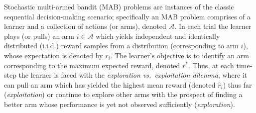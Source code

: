 Stochastic multi-armed bandit (MAB) problems are instances of the classic sequential decision-making scenario; specifically an MAB problem comprises of a learner and a collection of actions (or arms), denoted $\mathcal{A}$. In each trial the learner plays (or pulls) an arm $i\in\mathcal{A}$ which yields independent and identically distributed (i.i.d.) reward samples from a distribution (corresponding to arm $i$), whose expectation is denoted by $r_i$. 
The learner's objective is to identify an arm corresponding to the maximum expected reward, denoted $r^{*}$. Thus, at each time-step the learner 
is faced with the \emph{exploration vs.\ exploitation dilemma}, where it can pull an arm which has yielded the highest mean reward (denoted $\hat{r}_{i}$) thus far (\emph{exploitation}) or continue to explore other arms with the prospect of finding a better arm 
whose performance is yet not observed sufficiently (\emph{exploration}).



